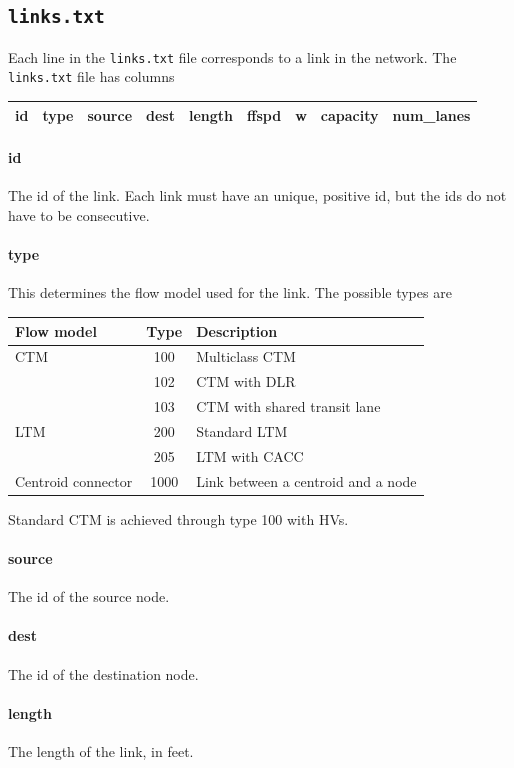 \subsection{\texttt{links.txt}}

Each line in the \texttt{links.txt} file corresponds to a link in the network. The \texttt{links.txt} file has columns
\begin{center}
\begin{tabular}{ccccccccc}
\hline
id & type & source & dest & length & ffspd & w & capacity & num\_lanes \\\hline
\end{tabular}
\end{center}
\paragraph*{id} The id of the link. Each link must have an unique, positive id, but the ids do not have to be consecutive.
\paragraph*{type} This determines the flow model used for the link. The possible types are
\begin{center}
\begin{tabular}{lcl}
\hline Flow model & Type & Description\\\hline
CTM & 100 & Multiclass CTM~\cite{levin2016multiclass} \\
& 102 & CTM with DLR~\cite{levin2016cell}\\
& 103 & CTM with shared transit lane\\\hline
LTM & 200 & Standard LTM~\cite{yperman2005link, yperman2007link}\\
& 205 & LTM with CACC\\\hline
Centroid connector & 1000 & Link between a centroid and a node\\\hline
\end{tabular}
\end{center}
Standard CTM is achieved through type 100 with HVs.
\paragraph*{source} The id of the source node.
\paragraph*{dest} The id of the destination node.
\paragraph*{length} The length of the link, in feet. 
